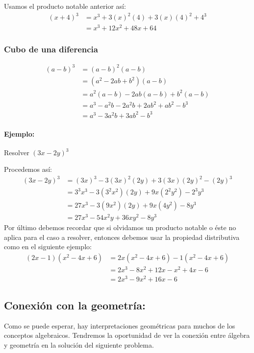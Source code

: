 \documentclass[10pt,twoside]{article}
\begin{document}
Usamos el producto notable anterior así:
\begin{align*}
(x+4)^3&=x^3+3(x)^2(4)+3(x)(4)^2+4^3\\
&=x^{3}+12x^2+48x+64
\end{align*}
\subsubsection*{Cubo de una diferencia}
\begin{align*}
(a-b)^3&=(a-b)^2(a-b)\\
&=(a^2-2ab+b^2)(a-b)\\
&=a^2(a-b)-2ab(a-b)+b^2(a-b)\\
&=a^3-a^2b-2a^2b+2ab^2+ab^2-b^3\\
&=a^3-3a^2b+3ab^2-b^3
\end{align*}
\paragraph*{Ejemplo:}

Resolver $(3x-2y)^3$

Procedemos así:
\begin{align*}
(3x-2y)^3&=(3x)^3-3(3x)^2(2y)+3(3x)(2y)^2-(2y)^3\\
&=3^3x^3-3(3^2x^2)(2y)+9x(2^2y^2)-2^3y^3\\
&=27x^3-3(9x^2)(2y)+9x(4y^2)-8y^3\\
&=27x^3-54x^2y+36xy^2-8y^3
\end{align*}
Por último debemos recordar que si olvidamos un producto notable o éste no aplica para el caso a resolver, entonces debemos usar la propiedad distributiva como en el siguiente ejemplo:
\begin{align*}
(2x-1)(x^2-4x+6)&=2x(x^2-4x+6)-1(x^2-4x+6)\\
&=2x^3-8x^2+12x-x^2+4x-6\\
&=2x^3-9x^2+16x-6
\end{align*}
\subsection*{Conexión con la geometr\'{i}a:}
Como se puede esperar, hay interpretaciones geométricas para muchos de los conceptos algebraicos. Tendremos la oportunidad de ver la conexión entre álgebra y geometría en la solución del siguiente problema.
\end{document}
